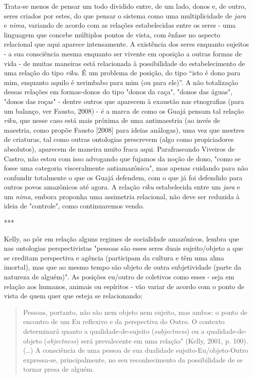 Trata-se menos de pensar um todo dividido entre, de um lado, donos e, de
outro, seres criados por estes, do que pensar o sistema como uma
multiplicidade de \emph{jara} e \emph{nima}, variando de acordo com as
relações estabelecidas entre os seres - uma linguagem que concebe
múltiplos pontos de vista, com ênfase no aspecto relacional que aqui
aparece intensamente. A existência dos seres enquanto sujeitos - a sua
consciência mesma enquanto ser vivente em oposição a outras formas de
vida - de muitas maneiras está relacionada à possibilidade do
estabelecimento de uma relação do tipo \emph{riku}. É um problema de
posição, do tipo ``isto é dono para mim, enquanto aquilo é xerimbabo
para mim (ou para ele)''. A não totalização dessas relações em
formas-donos do tipo "donos da caça", "donos das águas", "donos das
roças" - dentre outros que aparecem à exaustão nas etnografias (para um
balanço, ver Fausto, 2008) - é a marca de como os Guajá pensam tal
relação \emph{riku}, que nesse caso está mais próxima de uma
antimaestria (ao invés de maestria, como propõe Fausto {[}2008{]} para
ideias análogas), uma vez que mestres de criaturas, tal como outras
ontologias prescrevem (algo como propiciadores absolutos), aparecem de
maneira muito fraca aqui. Parafraseando Viveiros de Castro, não estou
com isso advogando que fujamos da noção de dono, "como se fosse uma
categoria visceralmente antiamazônica", mas apenas cuidando para não
confundir totalmente o que os Guajá defendem, com o que já foi defendido
para outros povos amazônicos até agora. A relação \emph{riku}
estabelecida entre um \emph{jara} e um \emph{nima}, embora proponha uma
assimetria relacional, não deve ser reduzida à ideia de "controle", como
continuaremos vendo.

***

Kelly, ao pôr em relação alguns regimes de socialidade amazônicos,
lembra que nas ontologias perspectivistas "pessoas são esses seres duais
sujeito/objeto a que se creditam perspectiva e agência (participam da
cultura e têm uma alma imortal), mas que ao mesmo tempo são objeto de
outra subjetividade (parte da natureza de alguém)". As posições eu/outro
de coletivos como esses - seja em relação aos humanos, animais ou
espíritos - vão variar de acordo com o ponto de vista de quem quer que
esteja se relacionando:

\begin{quote}
Pessoas, portanto, não são nem objeto nem sujeito, mas ambos: o ponto
de encontro de um Eu reflexivo e da perspectiva do Outro. O contexto
determinará quanto a qualidade-de-sujeito (\emph{subjectness}) ou a
qualidade-de-objeto (\emph{objectness}) será prevalecente em uma
relação" (Kelly, 2001, p. 100). (\ldots{}) A consciência de uma pessoa de sua
dualidade sujeito-Eu/objeto-Outro expressa-se, principalmente, no seu
reconhecimento da possibilidade de se tornar presa de alguém.
\end{quote}

